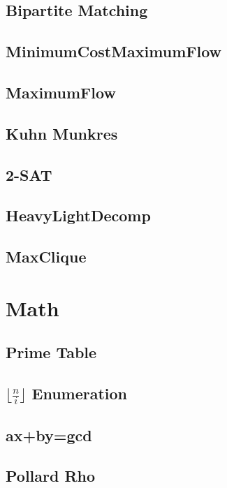 \documentclass[a4paper,10pt,twocolumn,oneside]{article}
\begin{document}
\subsection{Bipartite Matching}

\subsection{MinimumCostMaximumFlow}

\subsection{MaximumFlow}

\subsection{Kuhn Munkres}

\subsection{2-SAT}

\subsection{HeavyLightDecomp}

\subsection{MaxClique}


\section{Math}
\subsection{Prime Table}

\subsection{$\lfloor \frac{n}{i} \rfloor$ Enumeration}

\subsection{ax+by=gcd}

\subsection{Pollard Rho}

\end{document}
